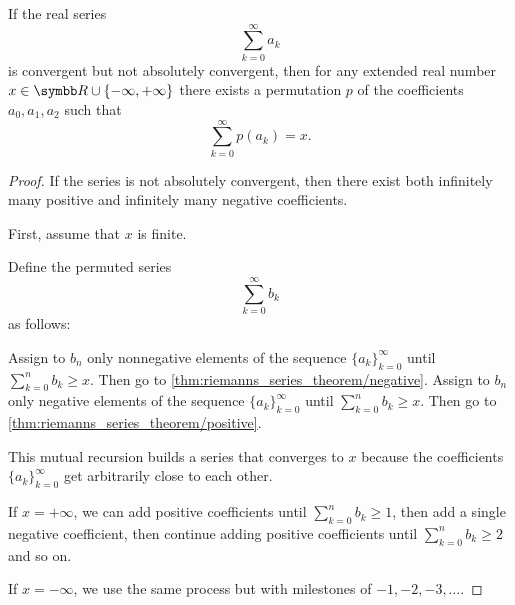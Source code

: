 \begin{theorem}\label{thm:riemanns_series_permutation_theorem}\cite[]{Фихтенгольц1968/2}
  If the real series
  \begin{equation*}
    \sum_{k=0}^\infty a_k
  \end{equation*}
  is convergent but not absolutely convergent, then for any extended real number \( x \in \BR \cup \{ -\infty, +\infty \} \) there exists a permutation \( p \) of the coefficients \( a_0, a_1, a_2 \)
  such that
  \begin{equation*}
    \sum_{k=0}^\infty p(a_k) = x.
  \end{equation*}
\end{theorem}
\begin{proof}
  If the series is not absolutely convergent, then there exist both infinitely many positive and infinitely many negative coefficients.

  First, assume that \( x \) is finite.

  Define the permuted series
  \begin{equation*}
    \sum_{k=0}^\infty b_k
  \end{equation*}
  as follows:
  \begin{algenum}
     Assign to \( b_n \) only nonnegative elements of the sequence \( \{ a_k \}_{k=0}^\infty \) until \( \sum_{k=0}^n b_k \geq x \). Then go to \cref{thm:riemanns_series_theorem/negative}.
     Assign to \( b_n \) only negative elements of the sequence \( \{ a_k \}_{k=0}^\infty \) until \( \sum_{k=0}^n b_k \geq x \). Then go to \cref{thm:riemanns_series_theorem/positive}.
  \end{algenum}

  This mutual recursion builds a series that converges to \( x \) because the coefficients \( \{ a_k \}_{k=0}^\infty \) get arbitrarily close to each other.

  If \( x = +\infty \), we can add positive coefficients until \( \sum_{k=0}^n b_k \geq 1 \), then add a single negative coefficient, then continue adding positive coefficients until \( \sum_{k=0}^n b_k \geq 2 \) and so on.

  If \( x = -\infty \), we use the same process but with milestones of \( -1, -2, -3, \ldots \).
\end{proof}

